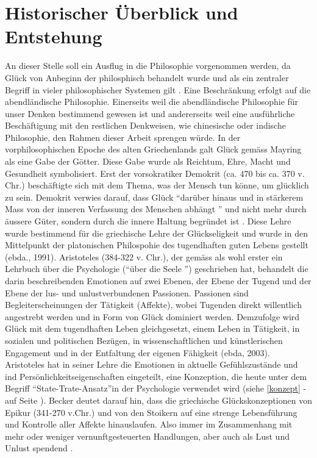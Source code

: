 \section{Historischer Überblick und Entstehung}\label{überblick}
\cite{Mayring:1991}
An dieser Stelle soll ein Ausflug in die Philosophie vorgenommen werden, da Glück von Anbeginn der philosphisch behandelt wurde und als ein zentraler Begriff in vieler philosophischer Systemen gilt \cite{Mayring:1991}. Eine Beschränkung erfolgt auf die abendländische Philosophie. Einerseits weil die abendländische Philosophie für unser Denken bestimmend gewesen ist und andererseits weil eine ausführliche Beschäftigung mit den restlichen Denkweisen, wie chinesische oder indische Philosophie, den Rahmen dieser Arbeit sprengen würde. \newline
In der vorphilosophischen Epoche des alten Griechenlands galt Glück gemäss Mayring \cite{Mayring:1991} als eine Gabe der Götter. Diese Gabe wurde als Reichtum, Ehre, Macht und Gesundheit symbolisiert. Erst der vorsokratiker Demokrit (ca. 470 bis ca. 370 v. Chr.) beschäftigte sich mit dem Thema, was der Mensch tun könne, um glücklich zu sein. Demokrit verwies darauf, dass Glück \textquotedblleft darüber hinaus und in stärkerem Mass von der inneren Verfassung des Menschen abhängt \textquotedblright \cite{Becker:1994} und nicht mehr durch äussere Güter, sondern durch die innere Haltung begründet ist \cite{Mayring:1991}. Diese Lehre wurde bestimmend für die griechische Lehre der Glückseligkeit und wurde in den Mittelpunkt der platonischen Philospohie des tugendhaften guten Lebens gestellt (ebda., 1991).\newline
Aristoteles (384-322 v. Chr.), der gemäss \cite{Mayring:2003} als wohl erster ein Lehrbuch über die Psychologie (\textquotedblleft über die Seele \textquotedblright) geschrieben hat, behandelt die darin beschreibenden Emotionen auf zwei Ebenen, der Ebene der Tugend und der Ebene der lus- und unlustverbundenen Passionen. Passionen sind Begleiterscheinungen der Tätigkeit (Affekte), wobei Tugenden direkt willentlich angestrebt werden und in Form von Glück dominiert werden. Demzufolge wird Glück mit dem tugendhaften Leben gleichgesetzt, einem Leben in Tätigkeit, in sozialen und politischen Bezügen, in wissenschaftlichen und künstlerischen Engagement und in der Entfaltung der eigenen Fähigkeit (ebda, 2003). Aristoteles hat in seiner Lehre die Emotionen in aktuelle Gefühlszustände und ind Persönlichkeitseigenschaften eingeteilt, eine Konzeption, die heute unter dem Begriff \textquotedblleft State-Trate-Ansatz\textquotedblright in der Psychologie verwendet wird (siehe \ref{konzept} -  auf Seite \pageref{konzept}). Becker \cite{Becker:1994} deutet darauf hin, dass die griechische Glückskonzeptionen von Epikur (341-270 v.Chr.) und von den Stoikern auf eine strenge Lebensführung und Kontrolle aller Affekte hinauslaufen. Also immer im Zusammenhang mit mehr oder weniger vernunftgesteuerten Handlungen, aber auch als Lust und Unlust spendend \cite{Mayring:2003}.\newline
